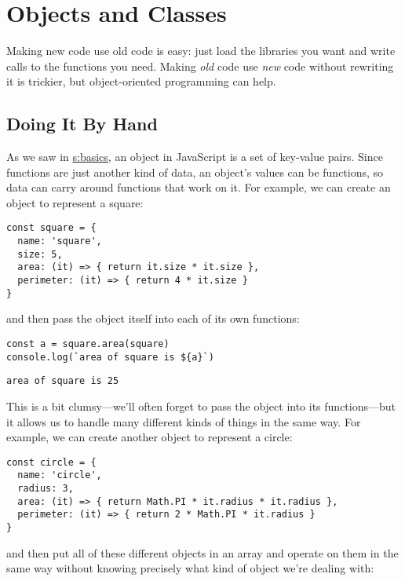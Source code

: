 \chapter{Objects and Classes}\label{s:oop}

Making new code use old code is easy:
just load the libraries you want and write calls to the functions you need.
Making \emph{old} code use \emph{new} code without rewriting it is trickier,
but object-oriented programming can help.

\section{Doing It By Hand}\label{s:oop-manual}

As we saw in \href{REF}{s:basics},
an object in JavaScript is a set of key-value pairs.
Since functions are just another kind of data,
an object's values can be functions,
so data can carry around functions that work on it.
For example,
we can create an object to represent a square:

\begin{verbatim}
const square = {
  name: 'square',
  size: 5,
  area: (it) => { return it.size * it.size },
  perimeter: (it) => { return 4 * it.size }
}
\end{verbatim}

\noindent
and then pass the object itself into each of its own functions:

\begin{verbatim}
const a = square.area(square)
console.log(`area of square is ${a}`)
\end{verbatim}

\begin{verbatim}
area of square is 25
\end{verbatim}

This is a bit clumsy---we'll often forget to pass the object into its functions---but
it allows us to handle many different kinds of things in the same way.
For example,
we can create another object to represent a circle:

\begin{verbatim}
const circle = {
  name: 'circle',
  radius: 3,
  area: (it) => { return Math.PI * it.radius * it.radius },
  perimeter: (it) => { return 2 * Math.PI * it.radius }
}
\end{verbatim}

\noindent
and then put all of these different objects in an array
and operate on them in the same way
without knowing precisely what kind of object we're dealing with:

